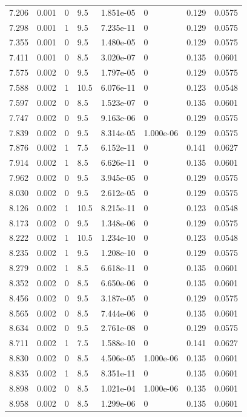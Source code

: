 \documentclass[preview]{standalone}
\begin{document}
{{{\begin{tabular}{L{1.2cm}C{1.2cm} C{0.3cm}C{0.5cm} C{1.4cm}C{1.4cm} C{1.4cm}C{1.4cm}}
  7.206  &  0.001  & 0     & 9.5 &  1.851e-05  & 0  & 0.129 &  0.0575   \\ 
  7.298  &  0.001  & 1     & 9.5 &  7.235e-11  & 0  & 0.129 &  0.0575   \\ 
  7.355  &  0.001  & 0     & 9.5 &  1.480e-05  & 0  & 0.129 &  0.0575   \\ 
  7.411  &  0.001  & 0     & 8.5 &  3.020e-07  & 0  & 0.135 &  0.0601   \\ 
  7.575  &  0.002  & 0     & 9.5 &  1.797e-05  & 0  & 0.129 &  0.0575   \\ 
  7.588  &  0.002  & 1     & 10.5 &  6.076e-11  & 0  & 0.123 &  0.0548   \\ 
  7.597  &  0.002  & 0     & 8.5 &  1.523e-07  & 0  & 0.135 &  0.0601   \\ 
  7.747  &  0.002  & 0     & 9.5 &  9.163e-06  & 0  & 0.129 &  0.0575   \\ 
  7.839  &  0.002  & 0     & 9.5 &  8.314e-05  & 1.000e-06  & 0.129 &  0.0575   \\ 
  7.876  &  0.002  & 1     & 7.5 &  6.152e-11  & 0  & 0.141 &  0.0627   \\ 
  7.914  &  0.002  & 1     & 8.5 &  6.626e-11  & 0  & 0.135 &  0.0601   \\ 
  7.962  &  0.002  & 0     & 9.5 &  3.945e-05  & 0  & 0.129 &  0.0575   \\ 
  8.030  &  0.002  & 0     & 9.5 &  2.612e-05  & 0  & 0.129 &  0.0575   \\ 
  8.126  &  0.002  & 1     & 10.5 &  8.215e-11  & 0  & 0.123 &  0.0548   \\ 
  8.173  &  0.002  & 0     & 9.5 &  1.348e-06  & 0  & 0.129 &  0.0575   \\ 
  8.222  &  0.002  & 1     & 10.5 &  1.234e-10  & 0  & 0.123 &  0.0548   \\ 
  8.235  &  0.002  & 1     & 9.5 &  1.208e-10  & 0  & 0.129 &  0.0575   \\ 
  8.279  &  0.002  & 1     & 8.5 &  6.618e-11  & 0  & 0.135 &  0.0601   \\ 
  8.352  &  0.002  & 0     & 8.5 &  6.650e-06  & 0  & 0.135 &  0.0601   \\ 
  8.456  &  0.002  & 0     & 9.5 &  3.187e-05  & 0  & 0.129 &  0.0575   \\ 
  8.565  &  0.002  & 0     & 8.5 &  7.444e-06  & 0  & 0.135 &  0.0601   \\ 
  8.634  &  0.002  & 0     & 9.5 &  2.761e-08  & 0  & 0.129 &  0.0575   \\ 
  8.711  &  0.002  & 1     & 7.5 &  1.588e-10  & 0  & 0.141 &  0.0627   \\ 
  8.830  &  0.002  & 0     & 8.5 &  4.506e-05  & 1.000e-06  & 0.135 &  0.0601   \\ 
  8.835  &  0.002  & 1     & 8.5 &  8.351e-11  & 0  & 0.135 &  0.0601   \\ 
  8.898  &  0.002  & 0     & 8.5 &  1.021e-04  & 1.000e-06  & 0.135 &  0.0601   \\ 
  8.958  &  0.002  & 0     & 8.5 &  1.299e-06  & 0  & 0.135 &  0.0601   \\ 
\hline 
\end{tabular} 

}}}
\end{document}
